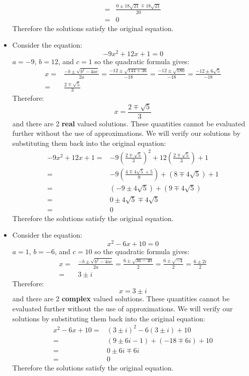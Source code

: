 \documentclass{article}
\begin{document}
\begin{itemize}
\begin{align*}
= & \frac{0 \pm 18\sqrt{21} \mp 18\sqrt{21}}{20} \\
= & 0
\end{align*}
Therefore the solutions satisfy the original equation.
\item Consider the equation: 
\[-9x^2 + 12x + 1 = 0\]
\(a = -9\), \(b = 12\), and \(c = 1\) so the quadratic formula gives:
\begin{align*}
x = & \frac{-b \pm \sqrt{b^2 - 4ac}}{2a} 
= \frac{-12 \pm \sqrt{144 + 36}}{-18} 
= \frac{-12 \pm \sqrt{180}}{-18} 
= \frac{-12 \pm 6\sqrt{5}}{-18} \\
= & \frac{2 \mp \sqrt{5}}{3}
\end{align*}
Therefore:
\[x = \frac{2 \mp \sqrt{5}}{3}\]
and there are 2 {\bf real} valued solutions. These quantities cannot be evaluated further without the use of approximations. We will verify our solutions by substituting them back into the original equation:
\begin{align*}
-9x^2 + 12x + 1 
= & -9\left(\frac{2 \mp \sqrt{5}}{3}\right)^2 + 12\left(\frac{2 \mp \sqrt{5}}{3}\right) + 1 \\
= & -9\left(\frac{4 \mp 4\sqrt{5} + 5}{9}\right) + (8 \mp 4\sqrt{5}) + 1 \\
= & (-9 \pm 4\sqrt{5}) + (9 \mp 4\sqrt{5}) \\
= & 0 \pm 4\sqrt{5} \mp 4\sqrt{5} \\
= & 0
\end{align*}
Therefore the solutions satisfy the original equation.
\item Consider the equation: 
\[x^2 - 6x + 10 = 0\]
\(a = 1\), \(b = -6\), and \(c = 10\) so the quadratic formula gives:
\begin{align*}
x = & \frac{-b \pm \sqrt{b^2 - 4ac}}{2a} 
= \frac{6 \pm \sqrt{36 - 40}}{2} 
= \frac{6 \pm \sqrt{-4}}{2} 
= \frac{6 \pm 2i}{2} \\
= & 3 \pm i
\end{align*}
Therefore:
\[x = 3 \pm i\]
and there are 2 {\bf complex} valued solutions. These quantities cannot be evaluated further without the use of approximations. We will verify our solutions by substituting them back into the original equation:
\begin{align*}
x^2 - 6x + 10
= & (3 \pm i)^2 - 6(3 \pm i) + 10 \\
= & (9 \pm 6i - 1) + (-18 \mp 6i) + 10 \\
= & 0 \pm 6i \mp 6i \\
= & 0
\end{align*}
Therefore the solutions satisfy the original equation.
\end{itemize}
\end{document}

